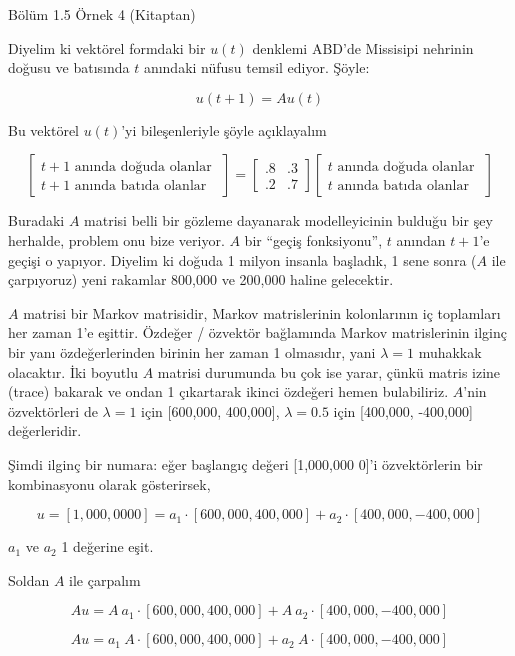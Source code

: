 \documentclass[12pt,fleqn]{article}\usepackage{../../common}
\begin{document}
Bölüm 1.5 Örnek 4 (Kitaptan)

Diyelim ki vektörel formdaki bir $u(t)$ denklemi ABD'de Missisipi nehrinin
doğusu ve batısında $t$ anındaki nüfusu temsil ediyor. Şöyle:

$$ u(t+1) = Au(t) $$

Bu vektörel $u(t)$'yi bileşenleriyle şöyle açıklayalım

$$ 
\left[\begin{array}{r}
t+1 \textrm{ anında doğuda olanlar } \\
t+1 \textrm{ anında batıda olanlar } 
\end{array}\right]
=
\left[\begin{array}{rr}
.8 & .3 \\
.2 & .7
\end{array}\right]
\left[\begin{array}{r}
t \textrm{ anında doğuda olanlar } \\
t \textrm{ anında batıda olanlar } 
\end{array}\right]
 $$

Buradaki $A$ matrisi belli bir gözleme dayanarak modelleyicinin bulduğu bir
şey herhalde, problem onu bize veriyor. $A$ bir ``geçiş fonksiyonu'', $t$
anından $t+1$'e geçişi o yapıyor. Diyelim ki doğuda 1 milyon insanla
başladık, 1 sene sonra ($A$ ile çarpıyoruz) yeni rakamlar 800,000 ve
200,000 haline gelecektir. 

$A$ matrisi bir Markov matrisidir, Markov matrislerinin kolonlarının iç
toplamları her zaman 1'e eşittir. Özdeğer / özvektör bağlamında Markov
matrislerinin ilginç bir yanı özdeğerlerinden birinin her zaman 1 olmasıdır,
yani $\lambda = 1$ muhakkak olacaktır. İki boyutlu $A$ matrisi durumunda bu çok
ise yarar, çünkü matris izine (trace) bakarak ve ondan 1 çıkartarak ikinci
özdeğeri hemen bulabiliriz. $A$'nin özvektörleri de $\lambda = 1$ için [600,000,
  400,000], $\lambda = 0.5$ için [400,000, -400,000] değerleridir.

Şimdi ilginç bir numara: eğer başlangıç değeri [1,000,000 0]'i özvektörlerin
bir kombinasyonu olarak gösterirsek,

$$ u = [1,000,000 0] = 
a_1 \cdot [600,000, 400,000] + 
a_2 \cdot [400,000, -400,000] $$

$a_1$ ve $a_2$ 1 değerine eşit. 

Soldan $A$ ile çarpalım

$$ Au = 
A \ a_1 \cdot [600,000, 400,000] + 
A \ a_2 \cdot [400,000, -400,000] $$

$$ Au = 
 a_1 \ A \cdot [600,000, 400,000] + 
 a_2 \ A \cdot [400,000, -400,000] $$
\end{document}
